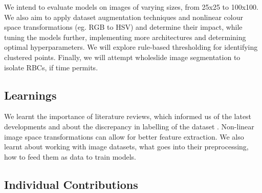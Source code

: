 \documentclass[10pt,twocolumn,letterpaper]{article}
\begin{document}
We intend to evaluate models on images of varying sizes, from 25x25 to 100x100. We also aim to apply dataset augmentation techniques and nonlinear colour space transformations (eg. RGB to HSV) and determine their impact, while tuning the models further, implementing more architectures and determining optimal hyperparameters. We will explore rule-based thresholding for identifying clustered points. Finally, we will attempt wholeslide image segmentation to isolate RBCs, if time permits.


\subsection{Learnings}

We learnt the importance of literature reviews, which informed us of the latest developments and about the discrepancy in labelling of the dataset \cite{fuhadmalaria}. Non-linear image space transformations can allow for better feature extraction. We also learnt about working with image datasets, what goes into their preprocessing, how to feed them as data to train models.

\subsection{Individual Contributions}







\end{document}
